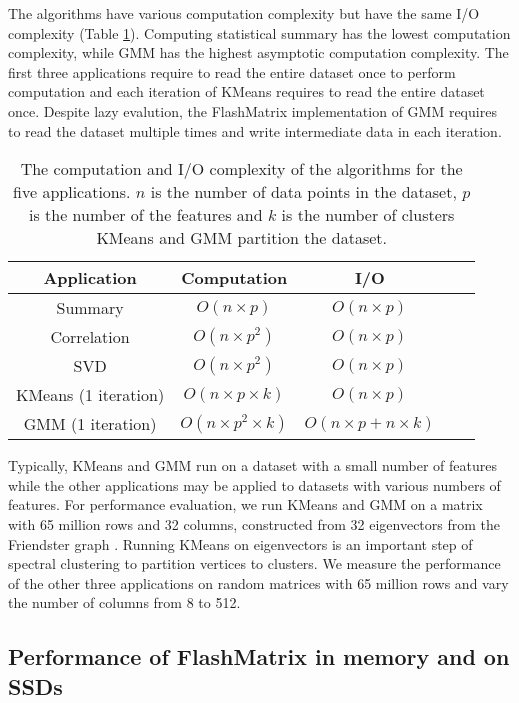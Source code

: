 The algorithms have various computation complexity but have the same I/O
complexity (Table \ref{tbl:algs}). Computing statistical summary
has the lowest computation complexity, while GMM has the highest asymptotic
computation complexity. The first three applications require to read the entire
dataset once to perform computation and each iteration of KMeans requires to
read the entire dataset once. Despite lazy evalution, the FlashMatrix
implementation of GMM requires to read the dataset multiple times and write
intermediate data in each iteration.

\begin{table}
\begin{center}
\footnotesize
\begin{tabular}{|c|c|c|c|c|}
\hline
Application & Computation & I/O \\
\hline
Summary & $O(n \times p)$ & $O(n \times p)$ \\
\hline
Correlation & $O(n \times p^2)$ & $O(n \times p)$ \\
\hline
SVD & $O(n \times p^2)$ & $O(n \times p)$ \\
\hline
KMeans (1 iteration) & $O(n \times p \times k)$ & $O(n \times p)$ \\
\hline
GMM (1 iteration) & $O(n \times p^2 \times k)$ & $O(n \times p + n \times k)$ \\
\hline
\end{tabular}
\normalsize
\end{center}
\caption{The computation and I/O complexity of the algorithms for the five
	applications. $n$ is the number of data points in the dataset, $p$ is
	the number of the features and $k$ is the number of clusters KMeans and
GMM partition the dataset.}
\label{tbl:algs}
\end{table}

Typically, KMeans and GMM run on a dataset with a small number of features
while the other applications may be applied to datasets with various numbers
of features. For performance evaluation, we run KMeans and GMM on a matrix
with 65 million rows and 32 columns, constructed from 32 eigenvectors from
the Friendster graph \cite{friendster}. Running KMeans on eigenvectors is
an important step of spectral clustering \cite{Luxburg07} to partition vertices
to clusters. We measure the performance of the other three applications on
random matrices with 65 million rows and vary the number of columns from 8
to 512.

\subsection{Performance of FlashMatrix in memory and on SSDs}

